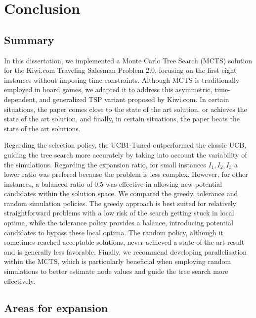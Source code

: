 \chapter{Conclusion}
\label{Chapter6}


\section{Summary}
\label{section:Summary}
In this dissertation, we implemented a Monte Carlo Tree Search (MCTS) solution for the Kiwi.com Traveling Salesman Problem 2.0, focusing on the first eight instances without imposing time constraints.
Although MCTS is traditionally employed in board games, we adapted it to address this asymmetric, time-dependent, and generalized TSP variant proposed by Kiwi.com.
In certain situations, the paper comes close to the state of the art solution, or achieves the state of the art solution, and finally, in certain situations, the paper beats the state of the art solutions.

Regarding the selection policy, the UCB1-Tuned outperformed the classic UCB, guiding the tree search more accurately by taking into account the variability of the simulations. Regarding the expansion ratio, for small instances $I_1, I_2, I_3$ a lower ratio was prefered because the problem is less complex. However, for other instances, a balanced ratio of 0.5 was effective in allowing new potential candidates within the solution space.
We compared the greedy, tolerance and random simulation policies. The greedy approach is best suited for relatively straightforward problems with a low risk of the search getting stuck in local optima, while the tolerance policy provides a balance, introducing potential candidates to bypass these local optima. The random policy, although it sometimes reached acceptable solutions, never achieved a state-of-the-art result and is generally less favorable.
Finally, we recommend developing parallelisation within the MCTS, which is particularly beneficial when employing random simulations to better estimate node values and guide the tree search more effectively.

\section{Areas for expansion}
\label{section:Critics}

